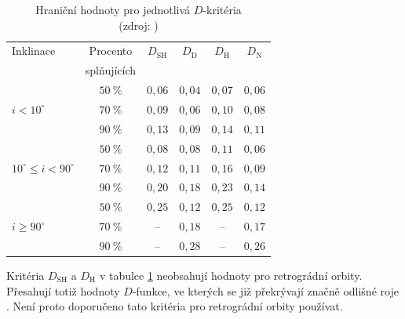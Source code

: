 \begin{table}[ht]
    \centering
    \caption[Hraniční hodnoty pro jednotlivá $D$-kritéria]{
        Hraniční hodnoty pro jednotlivá $D$-kritéria\\
        {\small (zdroj: \cite{galligan})}
    }
    \begin{tabular}{|l|c|c c c c|}
        \hline
        Inklinace                   & Procento    & $D_\text{SH}$ & $D_\text{D}$ & $D_\text{H}$ & $D_\text{N}$ \\
                                    & splňujících &               &              &              &              \\
        \hline
                                    & $50\:\%$    & $0{,}06$      & $0{,}04$     & $0{,}07$     & $0{,}06$     \\
        $i < 10^\circ$              & $70\:\%$    & $0{,}09$      & $0{,}06$     & $0{,}10$     & $0{,}08$     \\
                                    & $90\:\%$    & $0{,}13$      & $0{,}09$     & $0{,}14$     & $0{,}11$     \\
        \hline
                                    & $50\:\%$    & $0{,}08$      & $0{,}08$     & $0{,}11$     & $0{,}06$     \\
        $10^\circ \le i < 90^\circ$ & $70\:\%$    & $0{,}12$      & $0{,}11$     & $0{,}16$     & $0{,}09$     \\
                                    & $90\:\%$    & $0{,}20$      & $0{,}18$     & $0{,}23$     & $0{,}14$     \\
        \hline
                                    & $50\:\%$    & $0{,}25$      & $0{,}12$     & $0{,}25$     & $0{,}12$     \\
        $i \ge 90^\circ$            & $70\:\%$    & --            & $0{,}18$     & --           & $0{,}17$     \\
                                    & $90\:\%$    & --            & $0{,}28$     & --           & $0{,}26$     \\
        \hline
    \end{tabular}
    \label{tbl:performance:cutoffs}
\end{table}

Kritéria $D_\text{SH}$ a $D_\text{H}$ v tabulce \ref{tbl:performance:cutoffs} neobsahují hodnoty pro retrográdní orbity. Přesahují totiž hodnoty $D$-funkce, ve kterých se již překrývají značně odlišné roje \cite{galligan}. Není proto doporučeno tato kritéria pro retrográdní orbity používat.


